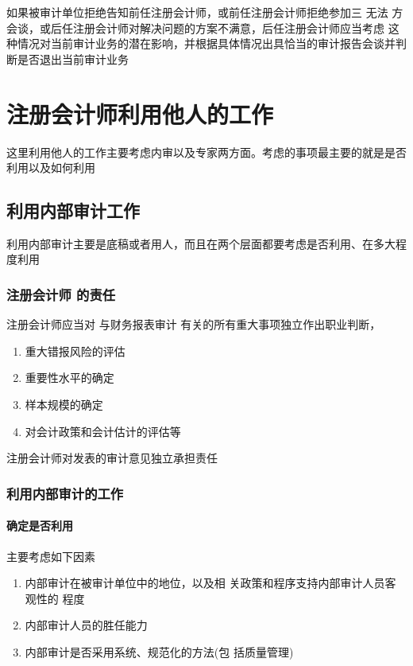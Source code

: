 \documentclass[UTF8,12pt]{ctexart}
\numberwithin{equation}{section} %
\numberwithin{figure}{section}
\numberwithin{table}{section}
\begin{document}
	 如果被审计单位拒绝告知前任注册会计师，或前任注册会计师拒绝参加三 无法 方会谈，或后任注册会计师对解决问题的方案不满意，后任注册会计师应当考虑 这种情况对当前审计业务的潜在影响，并根据具体情况出具恰当的审计报告会谈并判断是否退出当前审计业务
	
	\newpage
	\section{注册会计师利用他人的工作}
	这里利用他人的工作主要考虑内审以及专家两方面。考虑的事项最主要的就是是否利用以及如何利用
	\subsection{利用内部审计工作}
	利用内部审计主要是底稿或者用人，而且在两个层面都要考虑是否利用、在多大程度利用
	
	\subsubsection{注册会计师 的责任}
	注册会计师应当对  与财务报表审计 有关的所有重大事项独立作出职业判断，
	\begin{enumerate}
		\item 重大错报风险的评估
		
		\item 重要性水平的确定
		
		\item 样本规模的确定
		
		\item 对会计政策和会计估计的评估等
	\end{enumerate}
	注册会计师对发表的审计意见独立承担责任
	
	\subsubsection{利用内部审计的工作}
	\paragraph{确定是否利用}
	主要考虑如下因素
	\begin{enumerate}
		\item 内部审计在被审计单位中的地位，以及相 关政策和程序支持内部审计人员客观性的 程度
		
		\item 内部审计人员的胜任能力 
		
		\item 内部审计是否采用系统、规范化的方法(包 括质量管理)
	\end{enumerate}
	
\end{document}
